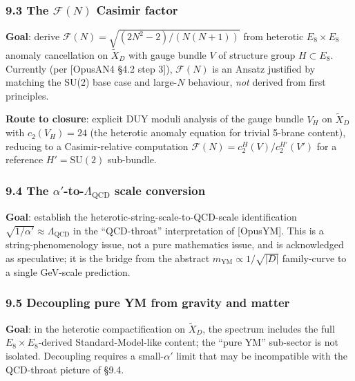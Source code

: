 \documentclass[
  11pt,
  a4paper,
]{amsart}
\begin{document}
\hypertarget{the-mathcalfn-casimir-factor}{%
\subsubsection{\texorpdfstring{9.3 The \(\mathcal{F}(N)\) Casimir factor}{9.3 The \textbackslash mathcal\{F\}(N) Casimir factor}}\label{the-mathcalfn-casimir-factor}}

\textbf{Goal}: derive \(\mathcal{F}(N) = \sqrt{(2N^2-2)/(N(N+1))}\) from
heterotic \(E_8 \times E_8\) anomaly cancellation on \(\widetilde{X}_D\) with
gauge bundle \(V\) of structure group \(H \subset E_8\). Currently (per {[}OpusAN4
§4.2 step 3{]}), \(\mathcal{F}(N)\) is an Ansatz justified by matching the SU(2)
base case and large-\(N\) behaviour, \emph{not} derived from first principles.

\textbf{Route to closure}: explicit DUY moduli analysis of the gauge bundle \(V_H\)
on \(\widetilde{X}_D\) with \(c_2(V_H) = 24\) (the heterotic anomaly equation for
trivial 5-brane content), reducing to a Casimir-relative computation
\(\mathcal{F}(N) = c_2^H(V) / c_2^{H'}(V')\) for a reference \(H' = \mathrm{SU}(2)\)
sub-bundle.

\hypertarget{the-alpha-to-lambda_mathrmqcd-scale-conversion}{%
\subsubsection{\texorpdfstring{9.4 The \(\alpha'\)-to-\(\Lambda_{\mathrm{QCD}}\) scale conversion}{9.4 The \textbackslash alpha\textquotesingle-to-\textbackslash Lambda\_\{\textbackslash mathrm\{QCD\}\} scale conversion}}\label{the-alpha-to-lambda_mathrmqcd-scale-conversion}}

\textbf{Goal}: establish the heterotic-string-scale-to-QCD-scale identification
\(\sqrt{1/\alpha'} \approx \Lambda_{\mathrm{QCD}}\) in the ``QCD-throat''
interpretation of {[}OpusYM{]}. This is a string-phenomenology issue, not a pure
mathematics issue, and is acknowledged as speculative; it is the bridge from
the abstract \(m_{\mathrm{YM}} \propto 1/\sqrt{|D|}\) family-curve to a single
GeV-scale prediction.

\hypertarget{decoupling-pure-ym-from-gravity-and-matter}{%
\subsubsection{9.5 Decoupling pure YM from gravity and matter}\label{decoupling-pure-ym-from-gravity-and-matter}}

\textbf{Goal}: in the heterotic compactification on \(\widetilde{X}_D\), the spectrum
includes the full \(E_8 \times E_8\)-derived Standard-Model-like content; the
``pure YM'' sub-sector is not isolated. Decoupling requires a small-\(\alpha'\)
limit that may be incompatible with the QCD-throat picture of §9.4.
\end{document}
